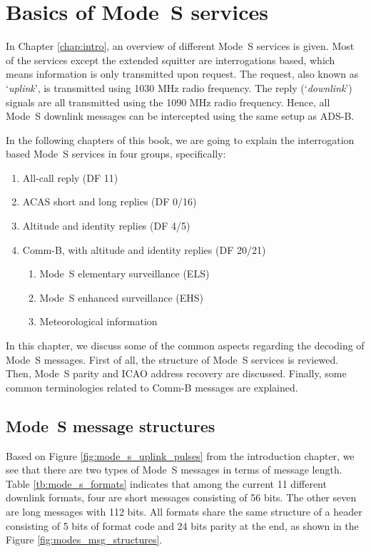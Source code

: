 \chapter{Basics of Mode~S services} \label{chap:mode_s_basics}

In Chapter \ref{chap:intro}, an overview of different Mode~S services is given. Most of the services except the extended squitter are interrogations based, which means information is only transmitted upon request. The request, also known as `\emph{uplink}', is transmitted using 1030 MHz radio frequency. The reply (`\emph{downlink}') signals are all transmitted using the 1090 MHz radio frequency. Hence, all Mode~S downlink messages can be intercepted using the same setup as ADS-B.

In the following chapters of this book, we are going to explain the interrogation based Mode~S services in four groups, specifically:

\begin{enumerate}
  \item All-call reply (DF 11)
  \item ACAS short and long replies (DF 0/16)
  \item Altitude and identity replies (DF 4/5)
  \item Comm-B, with altitude and identity replies (DF 20/21)
    \begin{enumerate}
      \item Mode~S elementary surveillance (ELS)
      \item Mode~S enhanced surveillance (EHS)
      \item Meteorological information
    \end{enumerate}
\end{enumerate}

In this chapter, we discuss some of the common aspects regarding the decoding of Mode~S messages. First of all, the structure of Mode~S services is reviewed. Then, Mode~S parity and ICAO address recovery are discussed. Finally, some common terminologies related to Comm-B messages are explained.


\section{Mode~S message structures}

Based on Figure \ref{fig:mode_s_uplink_pulses} from the introduction chapter, we see that there are two types of Mode~S messages in terms of message length. Table \ref{tb:mode_s_formats} indicates that among the current 11 different downlink formats, four are short messages consisting of 56 bits. The other seven are long messages with 112 bits. All formats share the same structure of a header consisting of 5 bits of format code and 24 bits parity at the end, as shown in the Figure \ref{fig:modes_msg_structures}.


